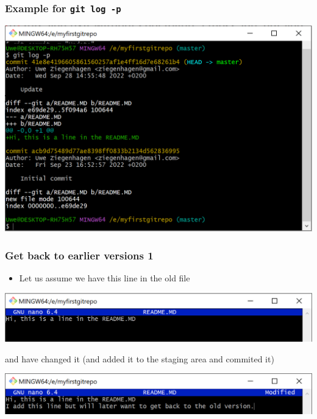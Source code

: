 \documentclass[12pt,english]{beamer}
\begin{document}
\begin{frame}
\frametitle{Example for \texttt{git log -p}}

\begin{center}
\includegraphics[width=\textwidth]{gitlogp}
\end{center}

\end{frame}

\begin{frame}
\frametitle{Get back to earlier versions 1}

\begin{itemize}
\item Let us assume we have this line in the old file
\end{itemize}

\begin{center}
\includegraphics[width=\textwidth]{getback-1}
\end{center}

and have changed it (and added it to the staging area and commited it) 

\begin{center}
\includegraphics[width=\textwidth]{getback-2}
\end{center}

\end{frame}
 
\end{document}
